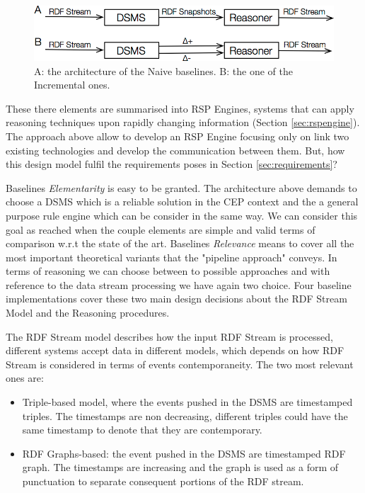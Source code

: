 \begin{figure}[tbh]
  \centering
	\includegraphics[width=\linewidth]{images/baselines-final}
	\caption{A: the architecture of the Naive baselines. B: the one of  the Incremental ones.} 
  	\label{fig:baselines}
\end{figure}
These there elements are summarised into RSP Engines, systems that can apply reasoning techniques upon rapidly changing information (Section \ref{sec:rspengine}). The approach above allow to develop an RSP Engine focusing only on link two existing technologies and develop the communication between them. But, how this design model fulfil the requirements poses in Section \ref{sec:requirements}?

Baselines \textit{Elementarity} is easy to be granted. The architecture above demands to choose a  DSMS which is a reliable solution in the CEP context  and the a general purpose rule engine which can be consider in the same way. We can consider this goal as reached when the couple elements are simple and valid terms of comparison w.r.t the state of the art.  Baselines \textit{Relevance} means to cover all the most important theoretical variants that the "pipeline approach" conveys. In terms of reasoning we can choose between to possible approaches and with reference to the data stream processing we have again two choice. Four baseline implementations cover these two main design decisions about the RDF Stream Model and the Reasoning procedures. 

The RDF Stream model describes how the input RDF Stream is processed, different systems accept data in different models, which depends on how RDF Stream is considered in terms of events contemporaneity. The two most relevant ones are:

\begin{itemize}	
\item Triple-based model, where the events pushed in the DSMS are timestamped triples. The timestamps are non decreasing, different triples could have the same timestamp to denote that they are contemporary.
\item RDF Graphs-based: the event pushed in the DSMS are timestamped RDF graph. The timestamps are increasing and the graph is used as a form of punctuation \cite{Tatbul2003b} to separate consequent portions of the RDF stream.
\end{itemize}

